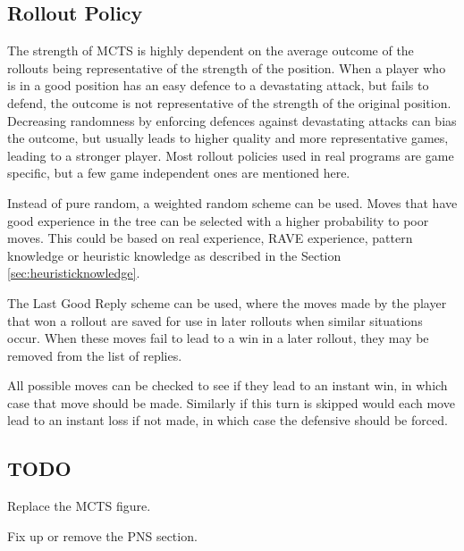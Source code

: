 \subsection{Rollout Policy}

The strength of MCTS is highly dependent on the average outcome of the rollouts being representative of the strength of the position. When a player who is in a good position has an easy defence to a devastating attack, but fails to defend, the outcome is not representative of the strength of the original position. Decreasing randomness by enforcing defences against devastating attacks can bias the outcome, but usually leads to higher quality and more representative games, leading to a stronger player. Most rollout policies used in real programs are game specific, but a few game independent ones are mentioned here.

Instead of pure random, a weighted random scheme can be used. Moves that have good experience in the tree can be selected with a higher probability to poor moves. This could be based on real experience, RAVE experience, pattern knowledge or heuristic knowledge as described in the Section \ref{sec:heuristicknowledge}.

The Last Good Reply \cite{drake2009lgr, baier2010lgrf} scheme can be used, where the moves made by the player that won a rollout are saved for use in later rollouts when similar situations occur. When these moves fail to lead to a win in a later rollout, they may be removed from the list of replies.

All possible moves can be checked to see if they lead to an instant win, in which case that move should be made. Similarly if this turn is skipped would each move lead to an instant loss if not made, in which case the defensive should be forced.


\subsection{TODO}

Replace the MCTS figure.

Fix up or remove the PNS section.





